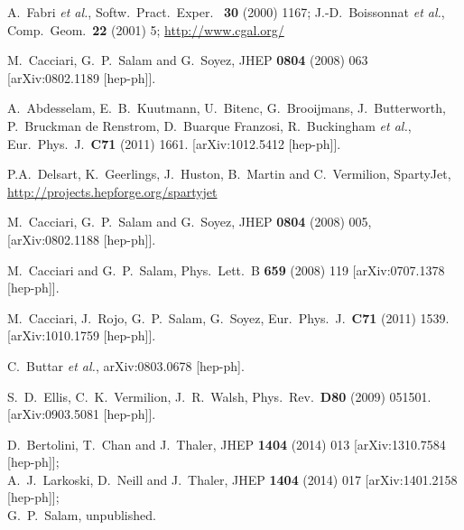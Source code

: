 \documentclass[12pt,a4]{article}
\begin{document}
\begin{thebibliography}{99}
A.~Fabri {\it et al.},
Softw.~Pract.~Exper.~ {\bf 30} (2000) 1167;
J.-D.~Boissonnat {\it et al.},
Comp.~Geom.~{\bf 22} (2001) 5; \url{http://www.cgal.org/}
  
  M.~Cacciari, G.~P.~Salam and G.~Soyez,
  JHEP {\bf 0804} (2008) 063
  [arXiv:0802.1189 [hep-ph]].

  A.~Abdesselam, E.~B.~Kuutmann, U.~Bitenc, G.~Brooijmans, J.~Butterworth, P.~Bruckman de Renstrom, D.~Buarque Franzosi, R.~Buckingham {\it et al.},
  Eur.\ Phys.\ J.\  {\bf C71 } (2011)  1661.
  [arXiv:1012.5412 [hep-ph]].

 P.A.~Delsart, K.~Geerlings, J.~Huston,
  B.~Martin and C.~Vermilion, SpartyJet,
  \url{http://projects.hepforge.org/spartyjet}

  M.~Cacciari, G.~P.~Salam and G.~Soyez,
  JHEP {\bf 0804} (2008) 005,
  [arXiv:0802.1188 [hep-ph]].

  M.~Cacciari and G.~P.~Salam,
  Phys.\ Lett.\  B {\bf 659} (2008) 119
  [arXiv:0707.1378 [hep-ph]].

  M.~Cacciari, J.~Rojo, G.~P.~Salam, G.~Soyez,
  Eur.\ Phys.\ J.\  {\bf C71 } (2011)  1539.
  [arXiv:1010.1759 [hep-ph]].

  C.~Buttar {\it et al.},
  arXiv:0803.0678 [hep-ph].

  S.~D.~Ellis, C.~K.~Vermilion, J.~R.~Walsh,
  Phys.\ Rev.\  {\bf D80 } (2009)  051501.
  [arXiv:0903.5081 [hep-ph]].

  D.~Bertolini, T.~Chan and J.~Thaler,
  JHEP {\bf 1404} (2014) 013
  [arXiv:1310.7584 [hep-ph]];\\
  A.~J.~Larkoski, D.~Neill and J.~Thaler,
  JHEP {\bf 1404} (2014) 017
  [arXiv:1401.2158 [hep-ph]];\\
%  
  G.~P.~Salam, unpublished.



\end{thebibliography}
\end{document}
